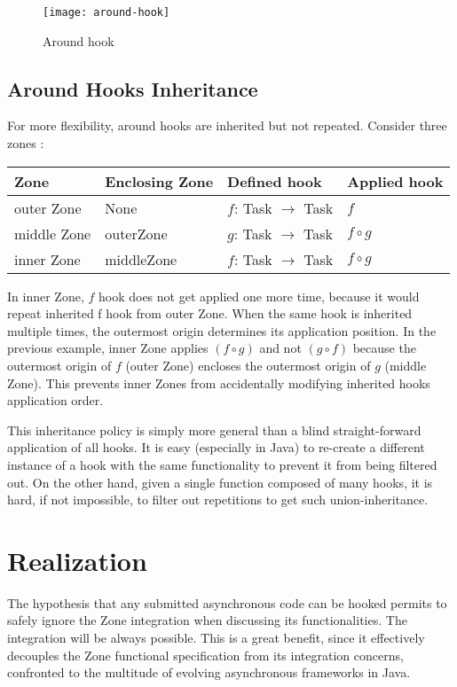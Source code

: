 \begin{figure}[h]
  \centering
  \texttt{[image: around-hook]}
  \caption{Around hook}
  \label{fig:around-hook}
\end{figure}

\subsection*{Around Hooks Inheritance}

For more flexibility, around hooks are inherited but not repeated. Consider three zones :

\begin{tabular}{|l|l|l|l|}
\hline
\textbf{Zone} & \textbf{Enclosing Zone} & \textbf{Defined hook} & \textbf{Applied hook}
\\\hline
outer Zone & None & $f$: Task $\rightarrow$ Task & $f$
\\\hline
middle Zone & outerZone & $g$: Task $\rightarrow$ Task & $f \circ g$
\\\hline
inner Zone & middleZone & $f$: Task $\rightarrow$ Task & $f \circ g$
\\\hline
\end{tabular}

In inner Zone, $f$ hook does not get applied one more time, because it would repeat inherited f hook from outer Zone. When the same hook is inherited multiple times, the outermost origin determines its application position. In the previous example, inner Zone applies $( f \circ g )$ and not $( g \circ f )$ because the outermost origin of $f$ (outer Zone) encloses the outermost origin of $g$ (middle Zone). This prevents inner Zones from accidentally modifying inherited hooks application order.

This inheritance policy is simply more general than a blind straight-forward application of all hooks. It is easy (especially in Java) to re-create a different instance of a hook with the same functionality to prevent it from being filtered out. On the other hand, given a single function composed of many hooks, it is hard, if not impossible, to filter out repetitions to get such union-inheritance.

\section{Realization}
\label{sec:realization}

The hypothesis that any submitted asynchronous code can be hooked permits to safely ignore the Zone integration when discussing its functionalities. The integration will be always possible. This is a great benefit, since it effectively decouples the Zone functional specification from its integration concerns, confronted to the multitude of evolving asynchronous frameworks in Java.

